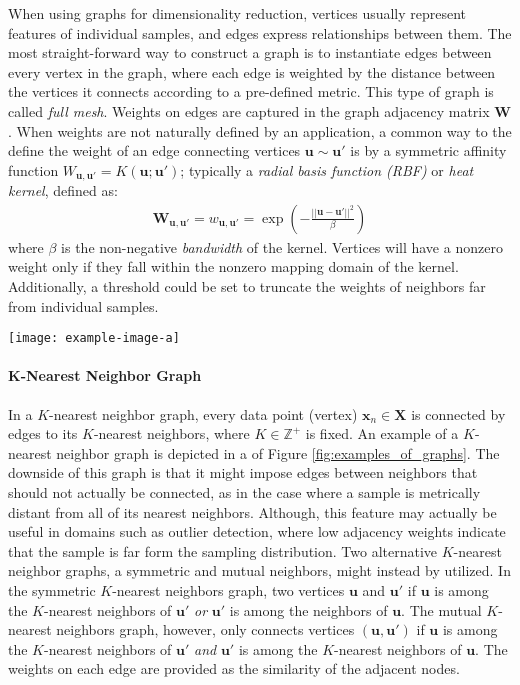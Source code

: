 When using graphs for dimensionality reduction, vertices usually represent features of individual samples, and edges express relationships between them.  The most straight-forward way to construct a graph is to instantiate edges between every vertex in the graph, where each edge is weighted by the distance between the vertices it connects according to a pre-defined metric.  This type of graph is called \textit{full mesh}. Weights on edges are captured in the graph adjacency matrix $\bm{W}$.  When weights are not naturally defined by an application, a common way to the define the weight of an edge connecting vertices $\bm{u} \sim \bm{u}'$ is by a symmetric affinity function $W_{\bm{u},\bm{u}'} = K(\bm{u};\bm{u}')$; typically a \textit{radial basis function (RBF)} or \textit{heat kernel}, defined as:
\begin{align}
\bm{W}_{\bm{u},\bm{u}'}= w_{\bm{u},\bm{u}'} = \exp \left ( - \frac{|| \bm{u} - \bm{u}' ||^{2}}{\beta}  \right )
\end{align}
\noindent
where $\beta$ is the non-negative \textit{bandwidth} of the kernel.  Vertices will have a nonzero weight only if they fall within the nonzero mapping domain of the kernel. Additionally, a threshold could be set to truncate the weights of neighbors far from individual samples.


\begin{center}
	\begin{figure*}[h]
		\centering
		\texttt{[image: example-image-a]}
		\caption[Examples of graphs.]{Examples of K-nearest neighbor and $\epsilon$-ball graphs}
		\label{fig:examples_of_graphs}
	\end{figure*}
\end{center}


\paragraph{$\bm{K}$-Nearest Neighbor Graph}
In a $K$-nearest neighbor graph, every data point (vertex) $\bm{x}_n \in \bm{X}$ is connected by edges to its $K$-nearest neighbors, where $K \in \mathbb{Z}^{+}$ is fixed. An example of a $K$-nearest neighbor graph is depicted in a of Figure \ref{fig:examples_of_graphs}. The downside of this graph is that it might impose edges between neighbors that should not actually be connected, as in the case where a sample is metrically distant from all of its nearest neighbors. Although, this feature may actually be useful in domains such as outlier detection, where low adjacency weights indicate that the sample is far form the sampling distribution.  Two alternative $K$-nearest neighbor graphs, a  symmetric and mutual neighbors, might instead by utilized.  In the symmetric $K$-nearest neighbors graph, two vertices $\bm{u}$ and $\bm{u}'$ if $\bm{u}$ is among the $K$-nearest neighbors of $\bm{u}'$ \textit{or} $\bm{u}'$ is among the neighbors of $\bm{u}$.  The mutual $K$-nearest neighbors graph, however, only connects vertices $(\bm{u},\bm{u}')$ if $\bm{u}$ is among the $K$-nearest neighbors of $\bm{u}'$ \textit{and} $\bm{u}'$ is among the $K$-nearest neighbors of $\bm{u}$.  The weights on each edge are provided as the similarity of the adjacent nodes.


